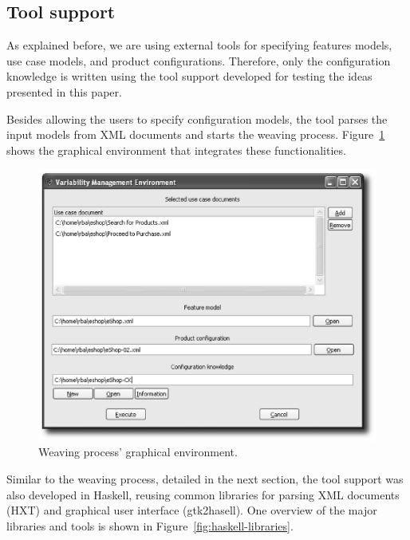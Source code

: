 \documentclass{acm_proc_article-sp}
\begin{document}
\subsection{Tool support}

{\color{red}As explained before, we are using external tools for specifying 
features models, use case models, and product configurations. Therefore, only 
the configuration knowledge is written using the tool support
{\color{blue}developed for testing the ideas presented in this paper.} 

Besides allowing the users to specify configuration models, the tool 
parses the input models from XML documents and starts the weaving process.
Figure~\ref{fig:graphical-environment} shows the graphical environment that
integrates these functionalities.

\begin{figure}[h]
 \begin{center}
  \includegraphics[scale=0.40]{img/msvcmTool.eps}
   \caption{Weaving process' graphical environment.}
  \label{fig:graphical-environment}
  \end{center}
\end{figure}

Similar to the weaving process, detailed in the next section, the tool support
was also developed in Haskell, reusing common libraries for parsing XML documents
(HXT) and graphical user interface (gtk2hasell). One overview of the major
libraries and tools is shown in Figure~\ref{fig:haskell-libraries}.}
\end{document}
